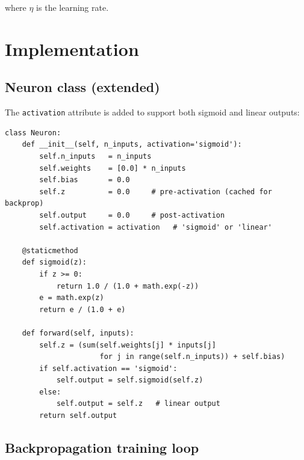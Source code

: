 \documentclass[12pt,a4paper]{article}
\begin{document}
where $\eta$ is the learning rate.

\section{Implementation}

\subsection{Neuron class (extended)}

The \texttt{activation} attribute is added to support both sigmoid and linear outputs:

\begin{lstlisting}[caption={Neuron class with configurable activation}]
class Neuron:
    def __init__(self, n_inputs, activation='sigmoid'):
        self.n_inputs   = n_inputs
        self.weights    = [0.0] * n_inputs
        self.bias       = 0.0
        self.z          = 0.0     # pre-activation (cached for backprop)
        self.output     = 0.0     # post-activation
        self.activation = activation   # 'sigmoid' or 'linear'

    @staticmethod
    def sigmoid(z):
        if z >= 0:
            return 1.0 / (1.0 + math.exp(-z))
        e = math.exp(z)
        return e / (1.0 + e)

    def forward(self, inputs):
        self.z = (sum(self.weights[j] * inputs[j]
                      for j in range(self.n_inputs)) + self.bias)
        if self.activation == 'sigmoid':
            self.output = self.sigmoid(self.z)
        else:
            self.output = self.z   # linear output
        return self.output
\end{lstlisting}

\subsection{Backpropagation training loop}
\end{document}
